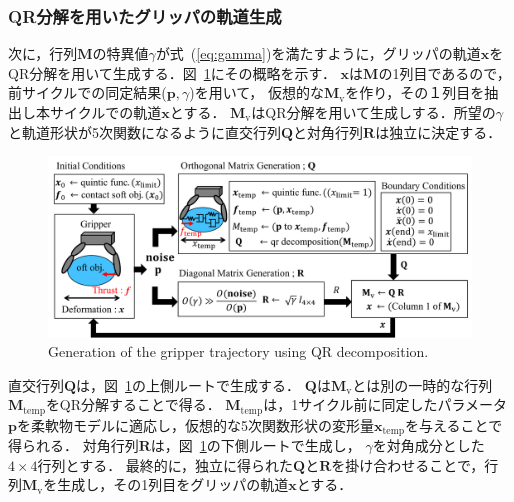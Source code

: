 \documentclass[a4paper]{jarticle}
\begin{document}
\subsubsection{QR分解を用いたグリッパの軌道生成}
\label{subsubsec:QR_traj_gen}
次に，行列$\mathbf{M}$の特異値$\gamma$が式~(\ref{eq:gamma})を満たすように，グリッパの軌道$\boldsymbol{x}$をQR分解を用いて生成する．図~{\ref{fig:QR_traj}}にその概略を示す．
$\boldsymbol{x}$は$\mathbf{M}$の1列目であるので，前サイクルでの同定結果($\mathbf{p},\gamma$)を用いて，
仮想的な$\mathbf{M}_{\mathrm{v}}$を作り，その１列目を抽出し本サイクルでの軌道$\boldsymbol{x}$とする．
$\mathbf{M_{\mathrm{v}}}$はQR分解を用いて生成しする．所望の$\gamma$と軌道形状が5次関数になるように直交行列$\mathbf{Q}$と対角行列$\mathbf{R}$は独立に決定する．
\begin{figure}[tb]
    \centering
    \includegraphics[width=1\textwidth]{QR_traj_eng.pdf}
    \captionsetup{width=0.9\linewidth} %
    \caption{Generation of the gripper trajectory using QR decomposition.}
    \label{fig:QR_traj}
\end{figure}
直交行列$\mathbf{Q}$は，図~\ref{fig:QR_traj}の上側ルートで生成する．
$\mathbf{Q}$は$\mathbf{M}_{\mathrm{v}}$とは別の一時的な行列$\mathbf{M}_{\mathrm{temp}}$をQR分解することで得る．
$\mathbf{M}_{\mathrm{temp}}$は，1サイクル前に同定したパラメータ$\mathbf{p}$を柔軟物モデルに適応し，仮想的な5次関数形状の変形量$\boldsymbol{x}_{\mathrm{temp}}$を与えることで得られる．
対角行列$\mathbf{R}$は，図~\ref{fig:QR_traj}の下側ルートで生成し，
$\gamma$を対角成分とした$4\times4$行列とする．
最終的に，独立に得られた$\mathbf{Q}$と$\mathbf{R}$を掛け合わせることで，行列$\mathbf{M_{\mathrm{v}}}$を生成し，その1列目をグリッパの軌道$\boldsymbol{x}$とする．
\end{document}

